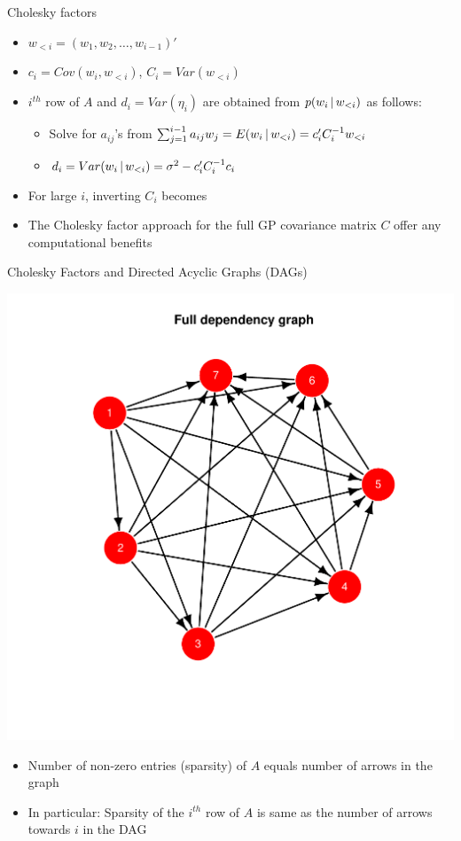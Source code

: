 \begin{frame}{Cholesky factors}
	\begin{itemize}
		\item $w_{<i}=(w_1,w_2,\ldots,w_{i-1})'$
		\item $c_i = Cov(w_i, w_{<i})$, $C_i = Var(w_{<i})$
		\item $i^{th}$ row of $A$ and $d_i=Var(\eta_i)$ are obtained from $p(w_i \,|\, w_{<i})$ as follows:
			\begin{itemize}[<+-> ]
				\item Solve for $a_{ij}$'s from $\sum_{j=1}^{i-1} a_{ij} w_j = E(w_i \,|\, w_{<i}) = c_i'C_i^{-1}w_{<i}$
				\item $d_i = Var(w_i \,|\, w_{<i}) = \sigma^2 - c_i'C_i^{-1}c_i$
			\end{itemize}
		\pause \item For large $i$, inverting $C_i$ becomes 
		\item The Cholesky factor approach for the full GP covariance matrix $C$  offer any computational benefits
	\end{itemize}
\end{frame}

\begin{frame}{Cholesky Factors and Directed Acyclic Graphs (DAGs)}
		\begin{center}
		\includegraphics[scale=0.35, trim={0 1cm 1cm 2cm}, clip]{../figures/nnfull.pdf}
	\end{center}
	\begin{itemize}
		\item Number of non-zero entries (\alert{sparsity}) of $A$ equals number of arrows in the graph
		\item In particular: Sparsity of the $i^{th}$ row of $A$ is same as the number of arrows towards $i$ in the DAG
	\end{itemize}
\end{frame}

